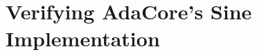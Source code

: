 \documentclass[runningheads]{llncs}
\begin{document}






\section{Verifying AdaCore's Sine Implementation}\label{sec:verifySin}
\end{document}
